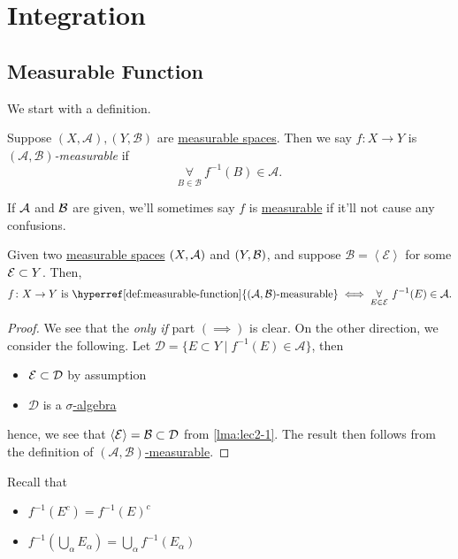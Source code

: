 \section{Integration}\label{sec:Integration}
\subsection{Measurable Function}
We start with a definition.

\begin{definition}\label{def:measurable-function}
	Suppose \((X, \mathcal{A} ), (Y, \mathcal{B} )\) are \hyperref[def:measurable-space]{measurable spaces}. Then we say \(f\colon X\to Y\) is
	\emph{\((\mathcal{A} , \mathcal{B} )\)-measurable} if
	\[
		\underset{B\in \mathcal{B}}{\forall}\ f^{-1} (B)\in \mathcal{A}.
	\]
\end{definition}

\begin{remark}
	If \(\mathcal{\MakeUppercase{a}} \) and \(\mathcal{\MakeUppercase{b}} \) are given, we'll sometimes say \(f\) is \hyperref[def:measurable-function]{measurable}
	if it'll not cause any confusions.
\end{remark}

\begin{lemma}\label{lma:lec10-1}
	Given two \hyperref[def:measurable-space]{measurable spaces} \((X, \mathcal{\MakeUppercase{a}} )\) and \((Y, \mathcal{\MakeUppercase{b}} )\), and suppose
	\(\mathcal{B} = \left< \mathcal{E}  \right> \) for some \(\mathcal{\MakeUppercase{e}} \subset Y\). Then,
	\[
		f\colon X\to Y \text{ is \hyperref[def:measurable-function]{\((\mathcal{A} , \mathcal{B})\)-measurable}}\iff \underset{E\in\mathcal{E}}{\forall}\ f^{-1} (E)\in \mathcal{A}.
	\]
\end{lemma}
\begin{proof}
	We see that the \emph{only if} part \((\implies )\) is clear. On the other direction, we consider the following. Let
	\(\mathcal{D} = \{E\subset Y \mid f^{-1} (E)\in \mathcal{A} \}\), then
	\begin{itemize}
		\item \(\mathcal{\MakeUppercase{e}} \subset \mathcal{D} \) by assumption
		\item \(\mathcal{D} \) is a \hyperref[def:sigma-algebra]{\(\sigma\)-algebra} 
	\end{itemize}
	hence, we see that \(\left< \mathcal{E} \right> = \mathcal{\MakeUppercase{b}} \subset \mathcal{D} \) from \autoref{lma:lec2-1}. The result then
	follows from the definition of \hyperref[def:measurable-function]{\((\mathcal{A} , \mathcal{B} )\)-measurable}.
\end{proof}
\begin{note}
	Recall that
	\begin{itemize}
		\item \(f^{-1} (E^{c} ) = f^{-1} (E)^{c} \)
		\item \(f^{-1} \left(\bigcup\limits_{\alpha} E_{\alpha }\right) = \bigcup\limits_{\alpha} f^{-1} (E_{\alpha })\)
	\end{itemize}
\end{note}

